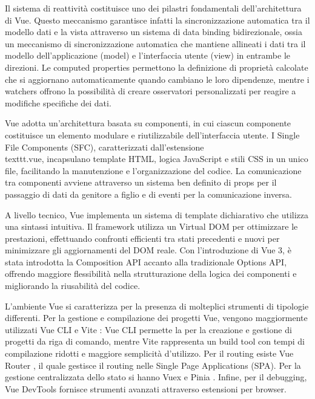 Il sistema di reattività costituisce uno dei pilastri fondamentali dell'architettura di Vue. Questo meccanismo garantisce infatti la sincronizzazione automatica tra il modello dati e la vista attraverso un sistema di data binding bidirezionale, ossia un meccanismo di sincronizzazione automatica che mantiene allineati i dati tra il modello dell'applicazione (model) e l'interfaccia utente (view) in entrambe le direzioni. Le computed properties permettono la definizione di proprietà calcolate che si aggiornano automaticamente quando cambiano le loro dipendenze, mentre i watchers offrono la possibilità di creare osservatori personalizzati per reagire a modifiche specifiche dei dati.

Vue adotta un'architettura basata su componenti, in cui ciascun componente costituisce un elemento modulare e riutilizzabile dell'interfaccia utente. I Single File Components (SFC), caratterizzati dall'estensione \\texttt{.vue}, incapsulano template HTML, logica JavaScript e stili CSS in un unico file, facilitando la manutenzione e l'organizzazione del codice. La comunicazione tra componenti avviene attraverso un sistema ben definito di props per il passaggio di dati da genitore a figlio e di eventi per la comunicazione inversa.

A livello tecnico, Vue implementa un sistema di template dichiarativo che utilizza una sintassi intuitiva. Il framework utilizza un Virtual DOM per ottimizzare le prestazioni, effettuando confronti efficienti tra stati precedenti e nuovi per minimizzare gli aggiornamenti del DOM reale. Con l'introduzione di Vue 3, è stata introdotta la Composition API accanto alla tradizionale Options API, offrendo maggiore flessibilità nella strutturazione della logica dei componenti e migliorando la riusabilità del codice.

L'ambiente Vue si caratterizza per la presenza di molteplici strumenti di tipologie differenti.
Per la gestione e compilazione dei progetti Vue, vengono maggiormente utilizzati Vue CLI \cite{vuecli2018} e Vite \cite{vite2021}:
Vue CLI permette la per la creazione e gestione di progetti da riga di comando, mentre Vite rappresenta un build tool con tempi di compilazione ridotti e maggiore semplicità d'utilizzo.
Per il routing esiste Vue Router \cite{vuerouter2016}, il quale gestisce il routing nelle Single Page Applications (SPA).
Per la gestione centralizzata dello stato si hanno Vuex \cite{vuex2016} e Pinia \cite{pinia2021}.
Infine, per il debugging, Vue DevTools \cite{vuedevtools2016} fornisce strumenti avanzati attraverso estensioni per browser.

